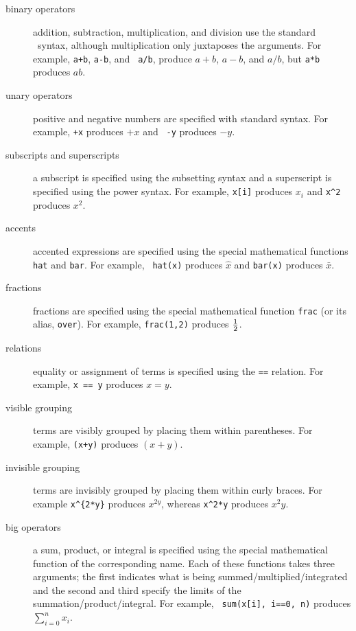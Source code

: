 \begin{description}
\item[binary operators]  addition, subtraction, multiplication, and
division use the standard \R\ syntax, although multiplication only
juxtaposes the arguments.  For example, {\tt a+b}, {\tt a-b}, and {\tt
a/b}, produce $a+b$, $a-b$, and $a/b$, but {\tt a*b} produces $ab$.

\item[unary operators]  positive and negative numbers are specified
with standard syntax.  For example, {\tt +x} produces $+x$ and {\tt
-y} produces $-y$.

\item[subscripts and superscripts]  a subscript is specified
using the subsetting syntax and a superscript is specified using
the power syntax.  For example, {\tt x[i]} produces
$x_i$ and {\tt x\^{}2} produces $x^2$.

\item[accents] accented expressions are specified using the special
mathematical functions {\tt hat} and {\tt bar}.  For example, {\tt
hat(x)} produces $\hat x$ and {\tt bar(x)} produces $\bar x$.

\item[fractions] fractions are specified using the special
mathematical function {\tt frac} (or its alias, {\tt over}). 
For example, {\tt frac(1,2)} produces $1\over2$.  

\item[relations]  equality or assignment of terms is specified using
the {\tt ==} relation.  For example, {\tt x == y} produces $x=y$.

\item[visible grouping]  terms are visibly grouped by placing them
within parentheses.  For example, {\tt (x+y)} produces $(x+y)$.

\item[invisible grouping]  terms are invisibly grouped by placing
them within curly braces. For example \verb|x^{2*y}| produces
$x^{2y}$, whereas {\tt x\^{}2*y} produces $x^2y$.

\item[big operators]  a sum, product, or integral is specified using
the special mathematical function of the corresponding name.  Each
of these functions takes three arguments;  the first indicates what
is being summed/multiplied/integrated and the second and third specify
the limits of the summation/product/integral.  For example, {\tt
sum(x[i], i==0, n)} produces $\sum\limits_{i=0}^n x_i$.


\end{description}
